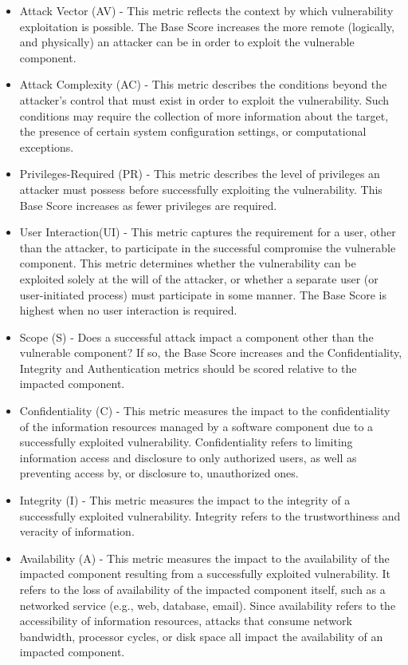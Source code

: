 \begin{itemize}
	\item Attack Vector (AV)  - This metric reflects the context by which vulnerability exploitation is possible. The Base Score increases the more remote (logically, and physically) an attacker can be in order to exploit the vulnerable component.  \\
	\item Attack Complexity (AC)   - This metric describes the conditions beyond the attacker’s control that must exist in order to exploit the vulnerability. Such conditions may require the collection of more information about the target, the presence of certain system configuration settings, or computational exceptions. \\
	\item Privileges-Required (PR) - This metric describes the level of privileges an attacker must possess before successfully exploiting the vulnerability. This Base Score increases as fewer privileges are required. \\
	\item User Interaction(UI) - This metric captures the requirement for a user, other than the attacker, to participate in the successful compromise the vulnerable component. This metric determines whether the vulnerability can be exploited solely at the will of the attacker, or whether a separate user (or user-initiated process) must participate in some manner. The Base Score is highest when no user interaction is required. \\
	\item Scope (S) - Does a successful attack impact a component other than the vulnerable component? If so, the Base Score increases and the Confidentiality, Integrity and Authentication metrics should be scored relative to the impacted component. \\
	\item Confidentiality (C) - This metric measures the impact to the confidentiality of the information resources managed by a software component due to a successfully exploited vulnerability. Confidentiality refers to limiting information access and disclosure to only authorized users, as well as preventing access by, or disclosure to, unauthorized ones. \\
	\item Integrity (I) - This metric measures the impact to the integrity of a successfully exploited vulnerability. Integrity refers to the trustworthiness and veracity of information. \\
	\item Availability (A) - This metric measures the impact to the availability of the impacted component resulting from a successfully exploited vulnerability. It refers to the loss of availability of the impacted component itself, such as a networked service (e.g., web, database, email). Since availability refers to the accessibility of information resources, attacks that consume network bandwidth, processor cycles, or disk space all impact the availability of an impacted component. \\
\end{itemize}

